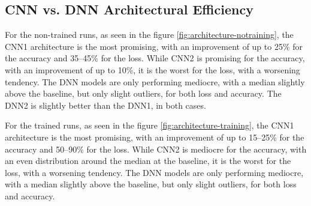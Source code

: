 \subsection{CNN vs. DNN Architectural Efficiency}\label{subsec:cnn-vs.-dnn-architectural-efficiency}
For the non-trained runs, as seen in the figure \ref{fig:architecture-notraining}, the CNN1 architecture is the most promising, with an improvement of up to 25\% for the accuracy and 35--45\% for the loss.
While CNN2 is promising for the accuracy, with an improvement of up to 10\%, it is the worst for the loss, with a worsening tendency.
The DNN models are only performing mediocre, with a median slightly above the baseline, but only slight outliers, for both loss and accuracy.
The DNN2 is slightly better than the DNN1, in both cases.

For the trained runs, as seen in the figure \ref{fig:architecture-training}, the CNN1 architecture is the most promising, with an improvement of up to 15--25\% for the accuracy and 50--90\% for the loss.
While CNN2 is mediocre for the accuracy, with an even distribution around the median at the baseline, it is the worst for the loss, with a worsening tendency.
The DNN models are only performing mediocre, with a median slightly above the baseline, but only slight outliers, for both loss and accuracy.

